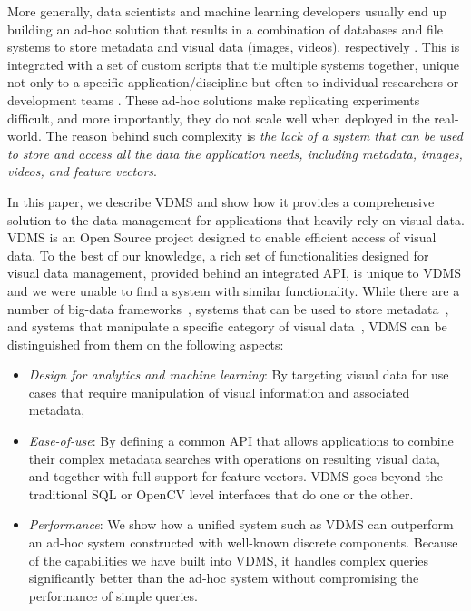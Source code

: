 More generally, data scientists and machine learning developers
usually end up building an ad-hoc solution that results in a
combination of databases and file systems to store
metadata and visual data (images, videos), respectively \cite{sculley2015hidden}.
This is integrated with a set of custom scripts that tie multiple systems together,
unique not only to a specific application/discipline but often
to individual researchers or development teams
\cite{mayer2020scalable, sculley2015hidden}.
These ad-hoc solutions make replicating experiments difficult,
and more importantly, they do not scale well when deployed in the real-world.
The reason behind such complexity is \textit{the lack of a system
that can be used to store and access all the data the application needs,
including metadata, images, videos, and feature vectors}.

In this paper, we describe VDMS and show how it provides a
comprehensive solution to the data management for applications
that heavily rely on visual data.
VDMS is an Open Source project designed to enable
efficient access of visual data.
To the best of our knowledge, a rich set of functionalities
designed for visual data management, provided behind an integrated API,
is unique to VDMS and we were unable to find a system with similar functionality.
While there are a number of big-data frameworks~\cite{spark, hadoop}, systems
that can be used to store metadata~\cite{memsql, vertica, mysql, postgresql},
and systems that manipulate a specific category of
visual data~\cite{scidb, rasdaman},
VDMS can be distinguished from them on the following aspects:

\begin{itemize}
\item {\em Design for analytics and machine learning}: By targeting
visual data for use cases that require manipulation
of visual information and associated metadata,
\item {\em Ease-of-use}: By defining a common API that allows applications to
combine their complex metadata searches with operations on resulting visual
data, and together with full support for feature vectors. VDMS goes beyond the
traditional SQL or OpenCV level interfaces that do one or the other.
\item {\em Performance}: We show how a unified system such as VDMS can
outperform an ad-hoc system constructed with well-known discrete components.
Because of the capabilities we have built into VDMS, it handles complex
queries significantly better than the ad-hoc system without compromising the
performance of simple queries.
\end{itemize}


